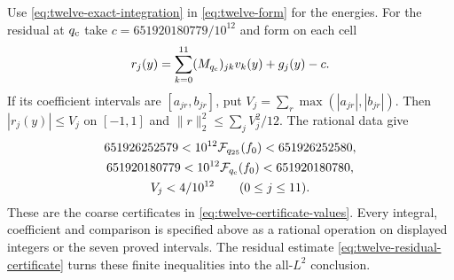 \documentclass[11pt,reqno]{amsart}
\numberwithin{equation}{section}
\begin{document}
Use \eqref{eq:twelve-exact-integration} in
\eqref{eq:twelve-form} for the energies.
For the residual at $q_{\rm c}$ take
$c=651920180779/10^{12}$ and form on each cell
\[
 r_j(y)=\sum_{k=0}^{11}(M_{q_{\rm c}})_{jk}v_k(y)+g_j(y)-c.
\]
If its coefficient intervals are $[a_{jr},b_{jr}]$, put
$V_j=\sum_r\max(|a_{jr}|,|b_{jr}|)$.
Then $|r_j(y)|\le V_j$ on $[-1,1]$ and
$\|r\|_2^2\le\sum_jV_j^2/12$.
The rational data give
\[
 \begin{gathered}
 651926252579<
 10^{12}\mathcal F_{q_{25}}(f_0)<651926252580,\\
 651920180779<
 10^{12}\mathcal F_{q_{\rm c}}(f_0)<651920180780,\\
 V_j<4/10^{12}\qquad(0\le j\le11).
 \end{gathered}
\]
These are the coarse certificates in
\eqref{eq:twelve-certificate-values}.
Every integral, coefficient and comparison is specified above
as a rational operation on displayed integers or the seven proved
intervals. The residual estimate
\eqref{eq:twelve-residual-certificate} turns these finite
inequalities into the all-$L^2$ conclusion.
\end{document}
